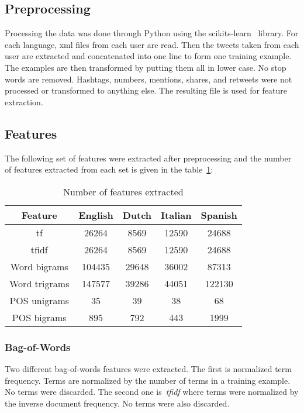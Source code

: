 \documentclass[a4paper]{llncs}
\begin{document}
\subsection{Preprocessing}
Processing the data was done through Python using the scikits-learn~\cite{scikit-learn} library. For each language, xml files from each user are read. Then the tweets taken from each user are extracted and concatenated into one line to form one training example. The examples are then transformed by putting them all in lower case. No stop words are removed. Hashtags, numbers, mentions, shares, and retweets were not processed or transformed to anything else. The resulting file is used for feature extraction.  

\subsection{Features}
The following set of features were extracted after preprocessing and the number of features extracted from each set is given in the table~\ref{table:numFeatures}: 

\begin{table}[!htbp]
  \centering
  \begin{tabular}{|c|cccc|}
    \hline
    Feature       & English & Dutch & Italian & Spanish \\ \hline
    tf            & 26264   & 8569  & 12590   & 24688   \\ %
    tfidf         & 26264   & 8569  & 12590   & 24688   \\ %
    Word bigrams  & 104435  & 29648 & 36002   & 87313   \\ %
    Word trigrams & 147577  & 39286 & 44051   & 122130  \\ %
    POS unigrams  & 35      & 39    & 38      & 68      \\ %
    POS bigrams   & 895     & 792   & 443     & 1999    \\ \hline
  \end{tabular}
  \caption{Number of features extracted}
  \label{table:numFeatures}
\end{table}

\subsubsection{Bag-of-Words}

Two different bag-of-words features were extracted. The first is normalized term frequency. Terms are normalized by the number of terms in a training example. No terms were discarded. The second one is~\textit{tfidf} where terms were normalized by the inverse document frequency. No terms were also discarded. 
\end{document}
